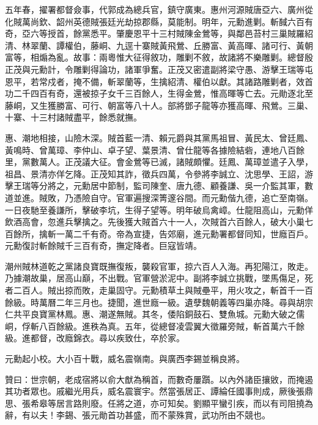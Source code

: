\begin{pinyinscope}
五年春，擢署都督僉事，代郭成為總兵官，鎮守廣東。惠州河源賊唐亞六、廣州從化賊萬尚欽、韶州英德賊張廷光劫掠郡縣，莫能制。明年，元勳進剿。斬馘六百有奇，亞六等授首，餘黨悉平。肇慶恩平十三村賊陳金鶯等，與鄰邑苔村三巢賊羅紹清、林翠蘭、譚權伯，藤峒、九逕十寨賊黃飛鶯、丘勝富、黃高暉、諸可行、黃朝富等，相煽為亂。故事：兩粵惟大征得敘功，雕剿不敘，故諸將不樂雕剿。總督殷正茂與元勳計，令雕剿得論功，諸軍爭奮。正茂又密遣副將梁守愚、游擊王瑞等屯恩平，若常戍者，掩不備，斬翠蘭等，生擒紹清、權伯以獻。其諸路雕剿者，效首功二千四百有奇，還被掠子女千三百餘人，生得金鶯，惟高暉等亡去。元勛逐北至藤峒，又生獲勝富、可行、朝富等八十人。部將鄧子龍等亦獲高暉、飛鶯。三巢、十寨、十三村諸賊盡平，餘悉就撫。

惠、潮地相接，山險木深。賊首藍一清、賴元爵與其黨馬祖冒、黃民太、曾廷鳳、黃鳴時、曾萬璋、李仲山、卓子望、葉景清、曾仕龍等各據險結砦，連地八百餘里，黨數萬人。正茂議大征。會金鶯等已滅，諸賊頗懼。廷鳳、萬璋並遣子入學，祖昌、景清亦佯乞降。正茂知其詐，徵兵四萬，令參將李誠立、沈思學、王詔，游擊王瑞等分將之，元勳居中節制，監司陳奎、唐九德、顧養謙、吳一介監其軍，數道並進。賊敗，乃憑險自守。官軍遍搜深箐邃谷間。而元勳偕九德，追亡至南嶺。一日夜馳至養謙所，擊破李坑，生得子望等。明年破烏禽嶂。仕龍阻高山，元勳佯飲酒高會，忽進兵擊擒之。先後獲大賊首六十一人，次賊首六百餘人，破大小巢七百餘所，擒斬一萬二千有奇。帝為宣捷，告郊廟，進元勳署都督同知，世廕百戶。元勳復討斬餘賊千三百有奇，撫定降者。巨寇皆靖。

潮州賊林道乾之黨諸良寶既撫復叛，襲殺官軍，掠六百人入海。再犯陽江，敗走。乃據潮故巢，居高山巔，不出戰。官軍營淤泥中。副將李誠立挑戰，墜馬傷足，死者二百人。賊出掠而敗，走巢固守。元勳積草土與賊壘平，用火攻之，斬首千一百餘級。時萬曆二年三月也。捷聞，進世廕一級。遺孽魏朝義等四巢亦降。尋與胡宗仁共平良寶黨林鳳。惠、潮遂無賊。其冬，倭陷銅鼓石、雙魚城。元勳大破之儒峒，俘斬八百餘級。進秩為真。五年，從總督凌雲翼大徵羅旁賊，斬首萬六千餘級。進都督，改廕錦衣。尋以疾致仕，卒於家。

元勳起小校。大小百十戰，威名震嶺南。與廣西李錫並稱良將。

贊曰：世宗朝，老成宿將以俞大猷為稱首，而數奇屢躓。以內外諸臣攘敓，而掩遏其功者眾也。戚繼光用兵，威名震寰宇。然當張居正、譚綸任國事則成，厥後張鼎思、張希皋等居言路則廢。任將之道，亦可知矣。劉顯平蠻引疾，而以有司阻撓為辭，有以夫！李錫、張元勛首功甚盛，而不蒙殊賞，武功所由不競也。


\end{pinyinscope}